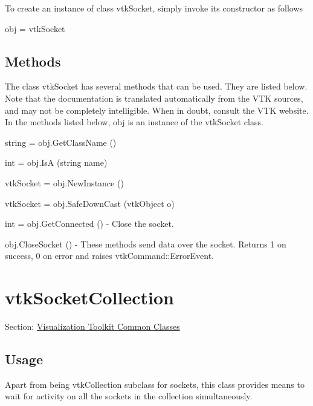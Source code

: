 To create an instance of class vtk\-Socket, simply invoke its constructor as follows \begin{DoxyVerb}  obj = vtkSocket
\end{DoxyVerb}
 \hypertarget{vtkwidgets_vtkxyplotwidget_Methods}{}\subsection{Methods}\label{vtkwidgets_vtkxyplotwidget_Methods}
The class vtk\-Socket has several methods that can be used. They are listed below. Note that the documentation is translated automatically from the V\-T\-K sources, and may not be completely intelligible. When in doubt, consult the V\-T\-K website. In the methods listed below, {\ttfamily obj} is an instance of the vtk\-Socket class. 
\begin{DoxyItemize}
\item {\ttfamily string = obj.\-Get\-Class\-Name ()}  
\item {\ttfamily int = obj.\-Is\-A (string name)}  
\item {\ttfamily vtk\-Socket = obj.\-New\-Instance ()}  
\item {\ttfamily vtk\-Socket = obj.\-Safe\-Down\-Cast (vtk\-Object o)}  
\item {\ttfamily int = obj.\-Get\-Connected ()} -\/ Close the socket.  
\item {\ttfamily obj.\-Close\-Socket ()} -\/ These methods send data over the socket. Returns 1 on success, 0 on error and raises vtk\-Command\-::\-Error\-Event.  
\end{DoxyItemize}\hypertarget{vtkcommon_vtksocketcollection}{}\section{vtk\-Socket\-Collection}\label{vtkcommon_vtksocketcollection}
Section\-: \hyperlink{sec_vtkcommon}{Visualization Toolkit Common Classes} \hypertarget{vtkwidgets_vtkxyplotwidget_Usage}{}\subsection{Usage}\label{vtkwidgets_vtkxyplotwidget_Usage}
Apart from being vtk\-Collection subclass for sockets, this class provides means to wait for activity on all the sockets in the collection simultaneously.

